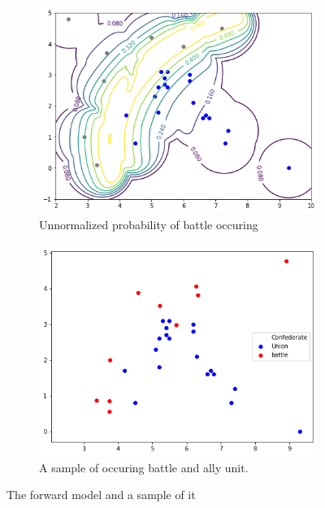 \documentclass{article}
\begin{document}
\begin{figure}[h]
  \begin{subfigure}[b]{0.49\linewidth}
    \includegraphics[width=\linewidth]{gettysburg-forward.png}
    \caption{Unnormalized probability of battle occuring}
  \end{subfigure}
  \begin{subfigure}[b]{0.49\linewidth}
    \includegraphics[width=\linewidth]{gettysburg-sample.png}
    \caption{A sample of occuring battle and ally unit.}
  \end{subfigure}
  \caption{The forward model and a sample of it}
  \label{fig:gettysburgTwo}
\end{figure}
\end{document}
